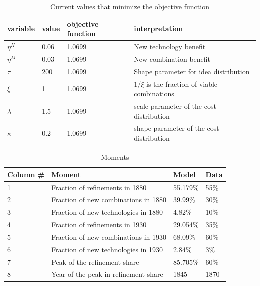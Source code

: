 \documentclass[a4paper,11pt]{article}
\begin{document}
\begin{table}
\centering
\begin{tabular}{llll}
\hline \hline
variable & value & objective function & interpretation \\ \hline
$\eta^H$ & 0.06 & 1.0699 & New technology benefit \\
$\eta^M$ & 0.03 & 1.0699 & New combination benefit \\
$\tau$ & 200 & 1.0699 & Shape parameter for idea distribution \\
$\xi$ & 1 & 1.0699 & $1/\xi$ is the fraction of viable combinations \\
$\lambda $ & 1.5 & 1.0699 & scale parameter of the cost distribution \\
$\kappa $ & 0.2 & 1.0699 & shape parameter of the cost distribution \\
\hline \hline
\end{tabular}
\caption{Current values that minimize the objective function}
\end{table}


\begin{table}
\centering
\begin{tabular}{llll}
\hline \hline
Column \# & Moment & Model & Data \\ \hline
1 & Fraction of refinements in 1880 & 55.179\% & 55\% \\
2 & Fraction of new combinations in 1880 & 39.99\% & 30\% \\
3 & Fraction of new technologies in 1880 & 4.82\% & 10\% \\
4 & Fraction of refinements in 1930 & 29.054\% & 35\% \\
5 & Fraction of new combinations in 1930 & 68.09\% & 60\% \\
6 & Fraction of new technologies in 1930 & 2.84\% & 3\% \\
7 & Peak of the refinement share & 85.705\% & 60\% \\
8 & Year of the peak in refinement share & 1845 & 1870 \\
\hline \hline
\end{tabular}
\caption{Moments}
\end{table}
\end{document}
